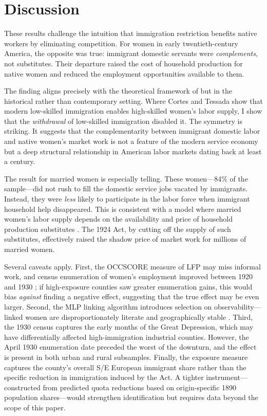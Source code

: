 \documentclass[12pt]{article}
\begin{document}
\section{Discussion}

These results challenge the intuition that immigration restriction benefits native workers by eliminating competition. For women in early twentieth-century America, the opposite was true: immigrant domestic servants were \emph{complements}, not substitutes. Their departure raised the cost of household production for native women and reduced the employment opportunities available to them.

The finding aligns precisely with the theoretical framework of \citet{CortesTossada2011} but in the historical rather than contemporary setting. Where Cortes and Tessada show that modern low-skilled immigration enables high-skilled women's labor supply, I show that the \emph{withdrawal} of low-skilled immigration disabled it. The symmetry is striking. It suggests that the complementarity between immigrant domestic labor and native women's market work is not a feature of the modern service economy but a deep structural relationship in American labor markets dating back at least a century.

The result for married women is especially telling. These women---84\% of the sample---did not rush to fill the domestic service jobs vacated by immigrants. Instead, they were \emph{less} likely to participate in the labor force when immigrant household help disappeared. This is consistent with a model where married women's labor supply depends on the availability and price of household production substitutes \citep{Goldin1990, Greenwood2005}. The 1924 Act, by cutting off the supply of such substitutes, effectively raised the shadow price of market work for millions of married women.

Several caveats apply. First, the OCCSCORE measure of LFP may miss informal work, and census enumeration of women's employment improved between 1920 and 1930 \citep{Goldin1990}; if high-exposure counties saw greater enumeration gains, this would bias \emph{against} finding a negative effect, suggesting that the true effect may be even larger. Second, the MLP linking algorithm introduces selection on observability---linked women are disproportionately literate and geographically stable \citep{Abramitzky2021}. Third, the 1930 census captures the early months of the Great Depression, which may have differentially affected high-immigration industrial counties. However, the April 1930 enumeration date preceded the worst of the downturn, and the effect is present in both urban and rural subsamples. Finally, the exposure measure captures the county's overall S/E European immigrant share rather than the specific reduction in immigration induced by the Act. A tighter instrument---constructed from predicted quota reductions based on origin-specific 1890 population shares---would strengthen identification but requires data beyond the scope of this paper.
\end{document}
